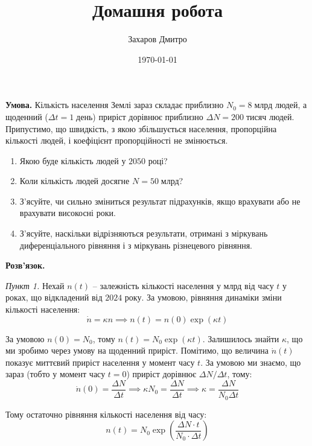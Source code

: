 \documentclass[oneside,solution]{tmpl}
\title{Домашня робота}
\author{Захаров Дмитро}
\date{\today}
\begin{document}
\maketitle



\textbf{Умова.} Кількість населення Землі зараз складає приблизно $N_0=8 \; \text{млрд}$ людей, а щоденний ($\Delta t = 1 \; \text{день}$) приріст дорівнює приблизно $\Delta N = 200 \; \text{тисяч}$ людей. Припустимо, що швидкість, з якою збільшується населення, пропорційна кількості людей, і коефіцієнт пропорційності не змінюється. 

\begin{enumerate}
    \item Якою буде кількість людей у $2050$ році?
    \item Коли кількість людей досягне $N = 50 \; \text{млрд}$?
    \item З'ясуйте, чи сильно зміниться результат підрахунків, якщо врахувати або не врахувати високосні роки.
    \item З'ясуйте, наскільки відрізняються результати, отримані з міркувань диференціального рівняння і з міркувань різнецевого рівняння.
\end{enumerate}

\textbf{Розв'язок.} 

\textit{Пункт 1.} Нехай $n(t)$ -- залежність кількості населення у млрд від часу $t$ у роках, що відкладений від $2024$ року. За умовою, рівняння динаміки зміни кількості населення:
\begin{equation}
    \dot{n} = \kappa n \implies n(t) = n(0)\exp(\kappa t)
\end{equation}

За умовою $n(0)=N_0$, тому $n(t)=N_0\exp(\kappa t)$. Залишилось знайти $\kappa$, що ми зробимо через умову на щоденний приріст. Помітимо, що величина $\dot{n}(t)$ показує миттєвий приріст населення у момент часу $t$. За умовою ми знаємо, що зараз (тобто у момент часу $t=0$) приріст дорівнює $\Delta N/\Delta t$, тому:
\begin{equation}
    \dot{n}(0) = \frac{\Delta N}{\Delta t} \implies \kappa N_0 = \frac{\Delta N}{\Delta t} \implies \kappa = \frac{\Delta N}{N_0 \Delta t}
\end{equation}

Тому остаточно рівняння кількості населення від часу:
\begin{equation}
    n(t) = N_0 \exp\left( \frac{\Delta N \cdot t}{N_0 \cdot \Delta t}\right)
\end{equation}
\end{document}

